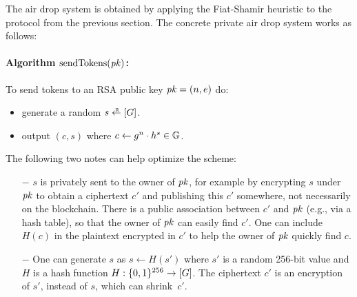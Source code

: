 \documentclass[11pt]{article}
\begin{document}
The air drop system is obtained by applying the Fiat-Shamir
heuristic to the protocol from the previous section. 
The concrete private air drop system works as follows:

\paragraph{Algorithm $\text{sendTokens}(\mathit{pk})$:}
To send tokens to an RSA public key $\mathit{pk} = (n, e)$ do:
\begin{itemize}
\item 
generate a random $s \rgets \range{G}$.

\item 
output $(c, s)$ where $c \gets g^n \cdot h^s \in \mathbb G$.
\end{itemize}

\medskip\noindent 
The following two notes can help optimize the scheme:
\begin{itemize}
\item[$-$] $s$ is privately sent to the owner of $\mathit{pk}$, for example
by encrypting $s$ under $\mathit{pk}$ to obtain a ciphertext $c'$ and
publishing this $c'$ somewhere, not necessarily on the blockchain.  There is
a public association between $c'$ and $\mathit{pk}$ (e.g., via a hash table),
so that the owner of $\mathit{pk}$ can easily find $c'$.  One can include
$H(c)$ in the plaintext encrypted in $c'$ to help the owner of $\mathit{pk}$
quickly find $c$.  

\item[$-$] One can generate $s$ 
as $s \gets H(s')$ where $s'$ is a random 256-bit value and $H$ is a hash
function $H:\{0,1\}^{256} \to [{G}]$.  The ciphertext $c'$ is
an encryption of $s'$, instead of $s$, which can shrink~$c'$.
\end{itemize}
\end{document}
